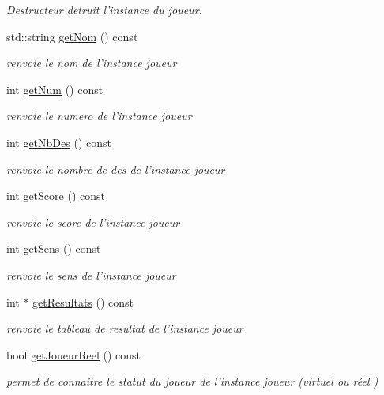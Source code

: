 \begin{DoxyCompactItemize}
\begin{DoxyCompactList}\small\item\em \-Destructeur detruit l'instance du joueur. \end{DoxyCompactList}\item 
std\-::string \hyperlink{class_joueur_a5acc4a585392bae5d27e5ff3261ee933}{get\-Nom} () const 
\begin{DoxyCompactList}\small\item\em renvoie le nom de l'instance joueur \end{DoxyCompactList}\item 
int \hyperlink{class_joueur_a2b24c871cd5579f40f70e145e73077ba}{get\-Num} () const 
\begin{DoxyCompactList}\small\item\em renvoie le numero de l'instance joueur \end{DoxyCompactList}\item 
int \hyperlink{class_joueur_ad28c0904a2a2e171c6a7281fa410cc03}{get\-Nb\-Des} () const 
\begin{DoxyCompactList}\small\item\em renvoie le nombre de des de l'instance joueur \end{DoxyCompactList}\item 
int \hyperlink{class_joueur_a87f12641d5012bc9bb34e8a67045b862}{get\-Score} () const 
\begin{DoxyCompactList}\small\item\em renvoie le score de l'instance joueur \end{DoxyCompactList}\item 
int \hyperlink{class_joueur_a9ad80d368caf73970ab2640ea85ee603}{get\-Sens} () const 
\begin{DoxyCompactList}\small\item\em renvoie le sens de l'instance joueur \end{DoxyCompactList}\item 
int $\ast$ \hyperlink{class_joueur_ac30c162c27a4f09166e912fceff4c65c}{get\-Resultats} () const 
\begin{DoxyCompactList}\small\item\em renvoie le tableau de resultat de l'instance joueur \end{DoxyCompactList}\item 
bool \hyperlink{class_joueur_a21814918148ca64e722061812af6b305}{get\-Joueur\-Reel} () const 
\begin{DoxyCompactList}\small\item\em permet de connaitre le statut du joueur de l'instance joueur (virtuel ou réel ) \end{DoxyCompactList}\item 

\end{DoxyCompactItemize}
